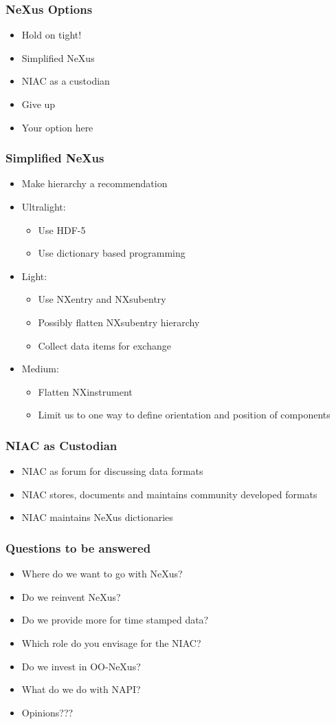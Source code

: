 \documentclass{beamer}
\begin{document}
\begin{frame}
\frametitle{NeXus Options}
\begin{itemize}
\item Hold on tight!
\item Simplified NeXus
\item NIAC as a custodian
\item Give up
\item Your option here
\end{itemize}
\end{frame}


\begin{frame}
\frametitle{Simplified NeXus}
\begin{itemize}
\item Make hierarchy a recommendation
\item Ultralight:
\begin{itemize}
\item Use HDF-5
\item Use dictionary based programming
\end{itemize}
\item Light:
\begin{itemize}
\item Use NXentry and NXsubentry
\item Possibly flatten NXsubentry hierarchy
\item Collect data items for exchange
\end{itemize}
\item Medium:
\begin{itemize}
\item Flatten NXinstrument
\item Limit us to one way to define orientation and position of components
\end{itemize}
\end{itemize}
\end{frame}

\begin{frame}
\frametitle{NIAC as Custodian}
\begin{itemize}
\item NIAC as forum for discussing data formats
\item NIAC stores, documents and maintains community developed formats
\item NIAC maintains NeXus dictionaries
\end{itemize}
\end{frame}


\begin{frame}
\frametitle{Questions to be answered}
\begin{itemize}
\item Where do we want to go with NeXus?
\item Do we reinvent NeXus?
\item Do we provide more for time stamped data?
\item Which role do you envisage for the NIAC?
\item Do we invest in OO-NeXus?
\item What do we do with NAPI?
\item Opinions???
\end{itemize}
\end{frame}
\end{document}
